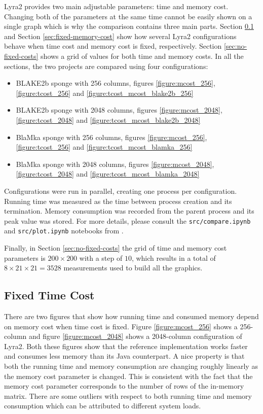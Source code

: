 Lyra2 provides two main adjustable parameters: time and memory cost. Changing both of the parameters at the same time cannot be easily shown on a single graph which is why the comparison contains three main parts. Section \ref{sec:fixed-time-cost} and Section \ref{sec:fixed-memory-cost} show how several Lyra2 configurations behave when time cost and memory cost is fixed, respectively. Section \ref{sec:no-fixed-costs} shows a grid of values for both time and memory costs. In all the sections, the two projects are compared using four configurations:

\begin{itemize}
    \item BLAKE2b sponge with 256 columns, figures \ref{figure:mcost_256}, \ref{figure:tcost_256} and \ref{figure:tcost_mcost_blake2b_256}
    \item BLAKE2b sponge with 2048 columns, figures \ref{figure:mcost_2048}, \ref{figure:tcost_2048} and \ref{figure:tcost_mcost_blake2b_2048}
    \item BlaMka sponge with 256 columns, figures \ref{figure:mcost_256}, \ref{figure:tcost_256} and \ref{figure:tcost_mcost_blamka_256}
    \item BlaMka sponge with 2048 columns, figures \ref{figure:mcost_2048}, \ref{figure:tcost_2048} and \ref{figure:tcost_mcost_blamka_2048}
  \end{itemize}

Configurations were run in parallel, creating one process per configuration. Running time was measured as the time between process creation and its termination. Memory consumption was recorded from the parent process and its peak value was stored. For more details, please consult the \texttt{src/compare.ipynb} and \texttt{src/plot.ipynb} notebooks from \cite{github:2017:lyra2-compare}.

Finally, in Section \ref{sec:no-fixed-costs} the grid of time and memory cost parameters is \(200 \times 200\) with a step of \(10\), which results in a total of \(8 \times 21 \times 21 = 3528\) measurements used to build all the graphics.

\subsection{Fixed Time Cost}
\label{sec:fixed-time-cost}

There are two figures that show how running time and consumed memory depend on memory cost when time cost is fixed. Figure \ref{figure:mcost_256} shows a 256-column and figure \ref{figure:mcost_2048} shows a 2048-column configuration of Lyra2. Both these figures show that the reference implementation works faster and consumes less memory than its Java counterpart. A nice property is that both the running time and memory consumption are changing roughly linearly as the memory cost parameter is changed. This is consistent with the fact that the memory cost parameter corresponds to the number of rows of the in-memory matrix. There are some outliers with respect to both running time and memory consumption which can be attributed to different system loads.

